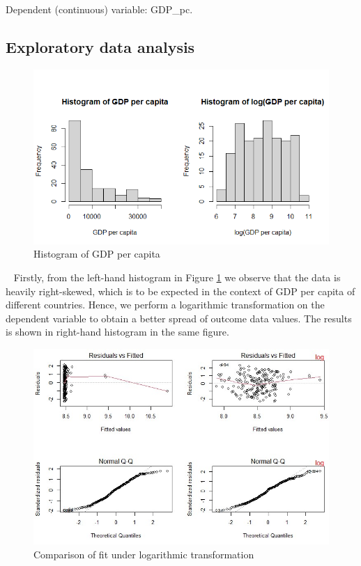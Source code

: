 \documentclass[12pt,a4paper]{article}
\renewcommand\texttt[1]{{\ttfamily\color{ttcolor}#1}}
\begin{document}
Dependent (continuous) variable: \texttt{GDP\_pc}.

\subsection{Exploratory data analysis}

\begin{figure}[h]
\centering
\includegraphics[width=0.8\linewidth]{histogram}
\caption{Histogram of GDP per capita}
\label{histogram}
\end{figure}

~\linebreak
Firstly, from the left-hand histogram in Figure \ref{histogram} we observe that the data is heavily right-skewed, which is to be expected in the context of GDP per capita of different countries. Hence, we perform a logarithmic transformation on the dependent variable to obtain a better spread of outcome data values. The results is shown in right-hand histogram in the same figure. 

\begin{figure}[h]
\centering
\includegraphics[width=1\linewidth]{log2}
\caption{Comparison of fit under logarithmic transformation}
\label{log}
\end{figure}
\end{document}
